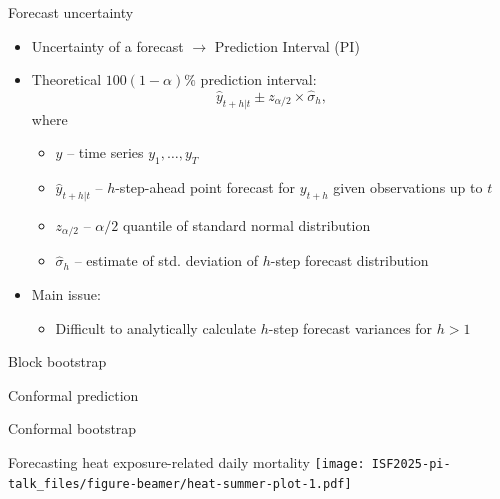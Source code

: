 \documentclass[
  12pt,
  ignorenonframetext,
  aspectratio=169,
]{beamer}
\begin{document}
\begin{frame}{Forecast uncertainty}
\label{forecast-uncertainty}
\begin{itemize}
  \item Uncertainty of a forecast \alert{${\rightarrow}$ Prediction Interval (PI)}
  \pause
  \item Theoretical $100(1 - \alpha)\%$ prediction interval:
$$
  \hat{y}_{t+h|t} \pm z_{\alpha/2} \times \hat{\sigma}_{h},
$$
where
  \begin{itemize}
    \item \small \color{black} $y$ -- \color{violet} time series $y_{1}, \dots, y_{T}$
    \item \small \color{black} $\hat{y}_{t+h|t}$ -- \color{violet} $h$-step-ahead point forecast for $y_{t+h}$ given observations up to $t$
    \item \small \color{black} $z_{\alpha/2}$ -- \color{violet} $\alpha/2$ quantile of standard normal distribution
    \item \small \color{black} $\hat{\sigma}_{h}$ -- \color{violet} estimate of std. deviation of $h$-step forecast distribution
  \end{itemize}
  \pause
  \item Main issue:
  \begin{itemize}
    \item \small \color{blue} Difficult to analytically calculate $h$-step forecast variances for $h > 1$
  \end{itemize}
\end{itemize}
\end{frame}

\begin{frame}{Block bootstrap}
\label{block-bootstrap}
\end{frame}

\begin{frame}{Conformal prediction}
\label{conformal-prediction}
\end{frame}

\begin{frame}{Conformal bootstrap}
\label{conformal-bootstrap}
\end{frame}

\begin{frame}{Forecasting heat exposure-related daily mortality}
\label{forecasting-heat-exposure-related-daily-mortality}
\texttt{[image: ISF2025-pi-talk\_files/figure-beamer/heat-summer-plot-1.pdf]}
\end{frame}
\end{document}
